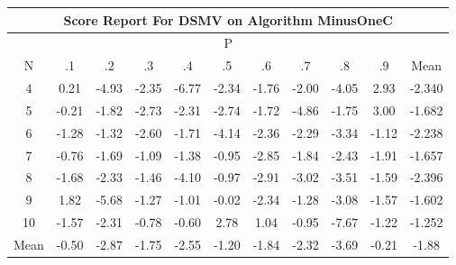 \documentclass[11pt,a4paper]{report}
\begin{document}
\begin{longtable}{ | c || c | c | c | c | c | c | c | c | c || c |}
\hline
\multicolumn{11}{|c|}{ Score Report For DSMV on Algorithm MinusOneC} \\
\hline
\multicolumn{11}{|c|}{ P } \\
\hline
N & .1 & .2 & .3 & .4 & .5 & .6 & .7 & .8 & .9 & Mean\\
 \hline
 \hline
 \endhead
  4 &  \cellcolor[HTML]{F7F7FF} 0.21 &  \cellcolor[HTML]{FF8080} -4.93 &  \cellcolor[HTML]{FFC7C7} -2.35 &  \cellcolor[HTML]{FF5858} -6.77 &  \cellcolor[HTML]{FFC7C7} -2.34 &  \cellcolor[HTML]{FFCFCF} -1.76 &  \cellcolor[HTML]{FFCFCF} -2.00 &  \cellcolor[HTML]{FF9797} -4.05 &  \cellcolor[HTML]{B7B7FF} 2.93 & -2.340 \\
  5 &  \cellcolor[HTML]{FFF7F7} -0.21 &  \cellcolor[HTML]{FFCFCF} -1.82 &  \cellcolor[HTML]{FFB7B7} -2.73 &  \cellcolor[HTML]{FFC7C7} -2.31 &  \cellcolor[HTML]{FFB7B7} -2.74 &  \cellcolor[HTML]{FFD7D7} -1.72 &  \cellcolor[HTML]{FF8787} -4.86 &  \cellcolor[HTML]{FFCFCF} -1.75 &  \cellcolor[HTML]{B7B7FF} 3.00 & -1.682 \\
  6 &  \cellcolor[HTML]{FFDFDF} -1.28 &  \cellcolor[HTML]{FFDFDF} -1.32 &  \cellcolor[HTML]{FFBFBF} -2.60 &  \cellcolor[HTML]{FFD7D7} -1.71 &  \cellcolor[HTML]{FF9797} -4.14 &  \cellcolor[HTML]{FFC7C7} -2.36 &  \cellcolor[HTML]{FFC7C7} -2.29 &  \cellcolor[HTML]{FFA7A7} -3.34 &  \cellcolor[HTML]{FFDFDF} -1.12 & -2.238 \\
  7 &  \cellcolor[HTML]{FFEFEF} -0.76 &  \cellcolor[HTML]{FFD7D7} -1.69 &  \cellcolor[HTML]{FFE7E7} -1.09 &  \cellcolor[HTML]{FFDFDF} -1.38 &  \cellcolor[HTML]{FFE7E7} -0.95 &  \cellcolor[HTML]{FFB7B7} -2.85 &  \cellcolor[HTML]{FFCFCF} -1.84 &  \cellcolor[HTML]{FFBFBF} -2.43 &  \cellcolor[HTML]{FFCFCF} -1.91 & -1.657 \\
  8 &  \cellcolor[HTML]{FFD7D7} -1.68 &  \cellcolor[HTML]{FFC7C7} -2.33 &  \cellcolor[HTML]{FFD7D7} -1.46 &  \cellcolor[HTML]{FF9797} -4.10 &  \cellcolor[HTML]{FFE7E7} -0.97 &  \cellcolor[HTML]{FFB7B7} -2.91 &  \cellcolor[HTML]{FFAFAF} -3.02 &  \cellcolor[HTML]{FFA7A7} -3.51 &  \cellcolor[HTML]{FFD7D7} -1.59 & -2.396 \\
  9 &  \cellcolor[HTML]{CFCFFF} 1.82 &  \cellcolor[HTML]{FF7070} -5.68 &  \cellcolor[HTML]{FFDFDF} -1.27 &  \cellcolor[HTML]{FFE7E7} -1.01 &  \cellcolor[HTML]{FFFFFF} -0.02 &  \cellcolor[HTML]{FFC7C7} -2.34 &  \cellcolor[HTML]{FFDFDF} -1.28 &  \cellcolor[HTML]{FFAFAF} -3.08 &  \cellcolor[HTML]{FFD7D7} -1.57 & -1.602 \\
  10 &  \cellcolor[HTML]{FFD7D7} -1.57 &  \cellcolor[HTML]{FFC7C7} -2.31 &  \cellcolor[HTML]{FFEFEF} -0.78 &  \cellcolor[HTML]{FFEFEF} -0.60 &  \cellcolor[HTML]{B7B7FF} 2.78 &  \cellcolor[HTML]{E7E7FF} 1.04 &  \cellcolor[HTML]{FFE7E7} -0.95 &  \cellcolor[HTML]{FF4040} -7.67 &  \cellcolor[HTML]{FFDFDF} -1.22 & -1.252 \\
 \hline
 \hline
Mean &  \cellcolor[HTML]{FFEFEF} -0.50 &  \cellcolor[HTML]{FFB7B7} -2.87 &  \cellcolor[HTML]{FFCFCF} -1.75 &  \cellcolor[HTML]{FFBFBF} -2.55 &  \cellcolor[HTML]{FFDFDF} -1.20 &  \cellcolor[HTML]{FFCFCF} -1.84 &  \cellcolor[HTML]{FFC7C7} -2.32 &  \cellcolor[HTML]{FF9F9F} -3.69 &  \cellcolor[HTML]{FFF7F7} -0.21 &  \cellcolor[HTML]{FFCFCF} -1.88
\end{longtable}
\end{document}
